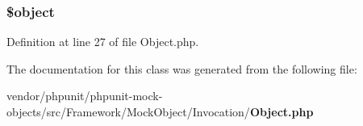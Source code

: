 \subsubsection[{\$object}]{\setlength{\rightskip}{0pt plus 5cm}\$object}\label{class_p_h_p_unit___framework___mock_object___invocation___object_a52123b83a1952a68c5513e47d59ec4a6}


Definition at line 27 of file Object.\+php.



The documentation for this class was generated from the following file\+:\begin{DoxyCompactItemize}
\item 
vendor/phpunit/phpunit-\/mock-\/objects/src/\+Framework/\+Mock\+Object/\+Invocation/{\bf Object.\+php}\end{DoxyCompactItemize}
